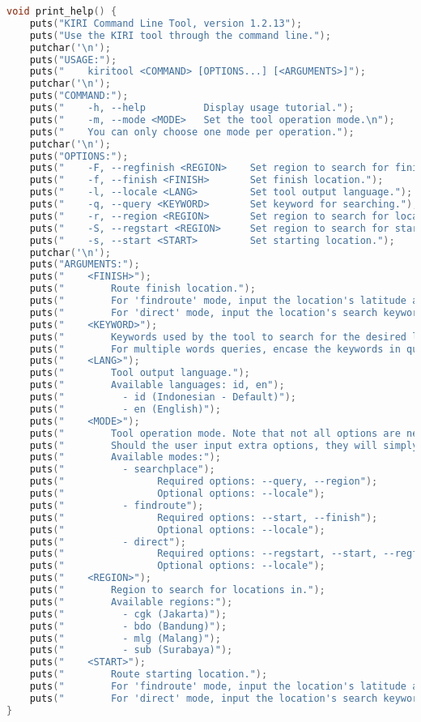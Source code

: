 \begin{itemize}[listparindent=\parindent]
	\begin{lstlisting}[language=C, caption=Implementasi fungsi print\textunderscore help(), label=code:kiritool-function-help]
void print_help() {
    puts("KIRI Command Line Tool, version 1.2.13");
    puts("Use the KIRI tool through the command line.");
    putchar('\n');
    puts("USAGE:");
    puts("    kiritool <COMMAND> [OPTIONS...] [<ARGUMENTS>]");
    putchar('\n');
    puts("COMMAND:");
    puts("    -h, --help          Display usage tutorial.");
    puts("    -m, --mode <MODE>   Set the tool operation mode.\n");
    puts("    You can only choose one mode per operation.");
    putchar('\n');
    puts("OPTIONS:");
    puts("    -F, --regfinish <REGION>    Set region to search for finish location in.");
    puts("    -f, --finish <FINISH>       Set finish location.");
    puts("    -l, --locale <LANG>         Set tool output language.");
    puts("    -q, --query <KEYWORD>       Set keyword for searching.");
    puts("    -r, --region <REGION>       Set region to search for location in.");
    puts("    -S, --regstart <REGION>     Set region to search for starting location in.");
    puts("    -s, --start <START>         Set starting location.");
    putchar('\n');
    puts("ARGUMENTS:");
    puts("    <FINISH>");
    puts("        Route finish location.");
    puts("        For 'findroute' mode, input the location's latitude and longitude coordinates.");
    puts("        For 'direct' mode, input the location's search keyword (<KEYWORD> argument).");
    puts("    <KEYWORD>");
    puts("        Keywords used by the tool to search for the desired location.");
    puts("        For multiple words queries, encase the keywords in quotation marks (\" \").");
    puts("    <LANG>");
    puts("        Tool output language.");
    puts("        Available languages: id, en");
    puts("          - id (Indonesian - Default)");
    puts("          - en (English)");
    puts("    <MODE>");
    puts("        Tool operation mode. Note that not all options are needed for all modes.");
    puts("        Should the user input extra options, they will simply not be used.");
    puts("        Available modes:");
    puts("          - searchplace");
    puts("                Required options: --query, --region");
    puts("                Optional options: --locale");
    puts("          - findroute");   
    puts("                Required options: --start, --finish");
    puts("                Optional options: --locale");
    puts("          - direct");   
    puts("                Required options: --regstart, --start, --regfinish, --finish");
    puts("                Optional options: --locale");
    puts("    <REGION>");
    puts("        Region to search for locations in.");
    puts("        Available regions:");
    puts("          - cgk (Jakarta)");
    puts("          - bdo (Bandung)");
    puts("          - mlg (Malang)");
    puts("          - sub (Surabaya)");
    puts("    <START>");
    puts("        Route starting location.");
    puts("        For 'findroute' mode, input the location's latitude and longitude coordinates.");
    puts("        For 'direct' mode, input the location's search keyword (<KEYWORD> argument).");
}
	\end{lstlisting}
	

\end{itemize}
